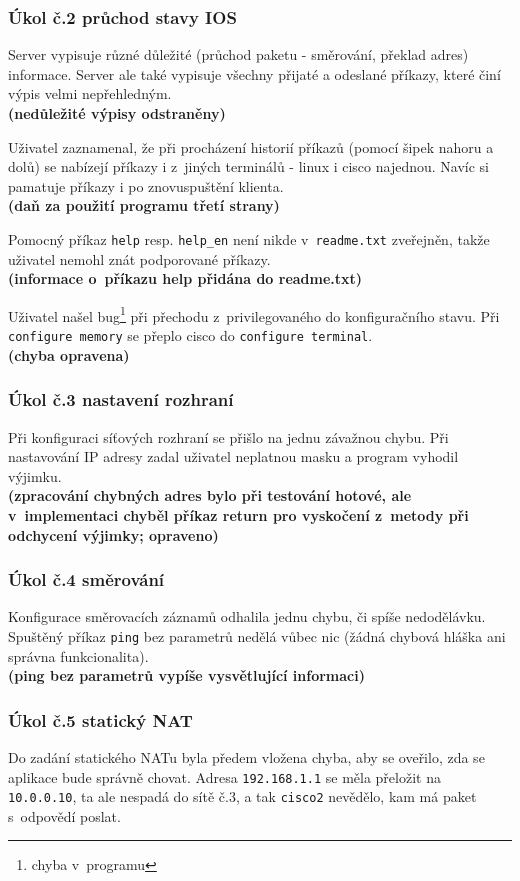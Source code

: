 \subsubsection{Úkol č.2 průchod stavy IOS}
Server vypisuje různé důležité (průchod paketu - směrování, překlad adres) informace. Server ale také vypisuje všechny přijaté a odeslané příkazy, které činí výpis velmi nepřehledným.
\\\textbf{(nedůležité výpisy odstraněny)}

Uživatel zaznamenal, že při procházení historií příkazů (pomocí šipek nahoru a dolů) se nabízejí příkazy i z~jiných terminálů - linux i cisco najednou. Navíc si pamatuje příkazy i po znovuspuštění klienta.
\\\textbf{(daň za použití programu třetí strany)}

Pomocný příkaz \verb|help| resp. \verb|help_en| není nikde v~\verb|readme.txt| zveřejněn, takže uživatel nemohl znát podporované příkazy.
\\\textbf{(informace o~příkazu help přidána do readme.txt)}

Uživatel našel bug\footnote{chyba v~programu} při přechodu z~privilegovaného do konfiguračního stavu. Při \\\verb|configure memory| se přeplo cisco do \verb|configure terminal|.
\\\textbf{(chyba opravena)}

\subsubsection{Úkol č.3 nastavení rozhraní}
Při konfiguraci síťových rozhraní se přišlo na jednu závažnou chybu. Při nastavování IP adresy zadal uživatel neplatnou masku a program vyhodil výjimku.
\\\textbf{(zpracování chybných adres bylo při testování hotové, ale v~implementaci chyběl příkaz return pro vyskočení z~metody při odchycení výjimky; opraveno)}

\subsubsection{Úkol č.4 směrování}
Konfigurace směrovacích záznamů odhalila jednu chybu, či spíše nedodělávku. Spuštěný příkaz \verb|ping| bez parametrů nedělá vůbec nic (žádná chybová hláška ani správna funkcionalita).
\\\textbf{(ping bez parametrů vypíše vysvětlující informaci)}

\subsubsection{Úkol č.5 statický NAT}
Do zadání statického NATu byla předem vložena chyba, aby se oveřilo, zda se aplikace bude správně chovat. Adresa \verb|192.168.1.1| se měla přeložit na \verb|10.0.0.10|, ta ale nespadá do sítě č.3, a tak \verb|cisco2| nevědělo, kam má paket s~odpovědí poslat.

